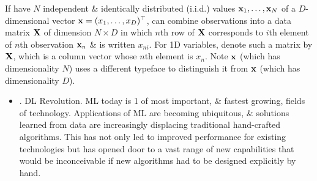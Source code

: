 \documentclass{article}
\begin{document}
\begin{itemize}
	If have $N$ independent \& identically distributed (i.i.d.) values ${\bf x}_1,\ldots,{\bf x}_N$ of a $D$-dimensional vector ${\bf x} = (x_1,\ldots,x_D)^\top$, can combine observations into a data matrix ${\bf X}$ of dimension $N\times D$ in which $n$th row of ${\bf X}$ corresponds to $i$th element of $n$th observation ${\bf x}_n$ \& is written $x_{ni}$. For 1D variables, denote such a matrix by ${\bf X}$, which is a column vector whose $n$th element is $x_n$. Note ${\bf x}$ (which has dimensionality $N$) uses a different typeface to distinguish it from ${\bf x}$ (which has dimensionality $D$).
	\begin{itemize}
		\item {. DL Revolution.} ML today is 1 of most important, \& fastest growing, fields of technology. Applications of ML are becoming ubiquitous, \& solutions learned from data are increasingly displacing traditional hand-crafted algorithms. This has not only led to improved performance for existing technologies but has opened door to a vast range of new capabilities that would be inconceivable if new algorithms had to be designed explicitly by hand.


\end{itemize}
\end{itemize}
\end{document}
